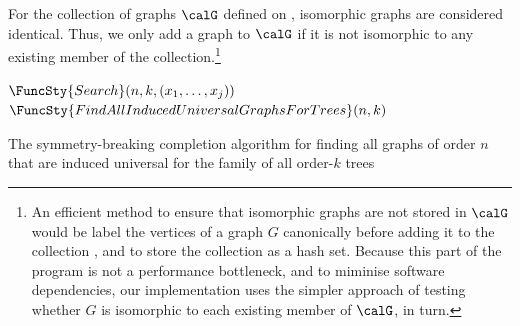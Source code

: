 For the collection of graphs $\calG$ defined on ,
isomorphic graphs are considered identical.  Thus, we only add a graph
to $\calG$ if it is not isomorphic to any existing member of the
collection.\footnote{An efficient method to ensure that isomorphic
graphs are not stored in $\calG$ would be label the vertices
of a graph $G$ canonically before adding it to the collection
\cite{DBLP:journals/jsc/McKayP14}, and to store the collection as a
hash set.  Because this part of the program is not a performance
bottleneck, and to miminise software dependencies, our implementation
uses the simpler approach of testing whether $G$ is isomorphic
to each existing member of $\calG$, in turn.}

\begin{algorithm}[h!]
\DontPrintSemicolon
\nl $\FuncSty{Search}(n,k,(x_1, \dots, x_j))$ \;
\nl {}
\nl {}
\nl {}
\medskip
\nl $\FuncSty{FindAllInducedUniversalGraphsForTrees}(n,k)$ \;
\nl {}
\nl {}
\nl {}
\caption{The symmetry-breaking completion algorithm for finding all graphs of order $n$
    that are induced universal for the family of all order-$k$ trees}
\label{alg:completion}
\end{algorithm}

